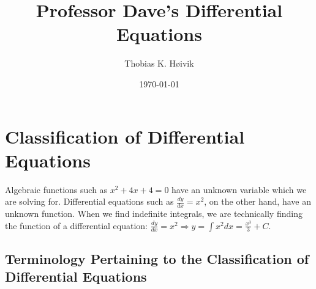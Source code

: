 \documentclass[12pt]{article}
\title{Professor Dave's Differential Equations}
\author{Thobias K. Høivik}
\date{\today}
\begin{document}
\maketitle
\section*{Classification of Differential Equations}
Algebraic functions such as \(x^2 + 4x + 4 = 0\) have an unknown variable which
we are solving for. 
Differential equations such as \(\frac{dy}{dx} = x^2\), on the other hand, 
have an unknown function.
When we find indefinite integrals, we are technically finding the function 
of a differential equation: \(\frac{dy}{dx} = x^2 
\Rightarrow y = \displaystyle\int x^2 dx = \frac{x^3}{3} + C\). 

\subsection*{Terminology Pertaining to the Classification of Differential Equations}
\end{document}
